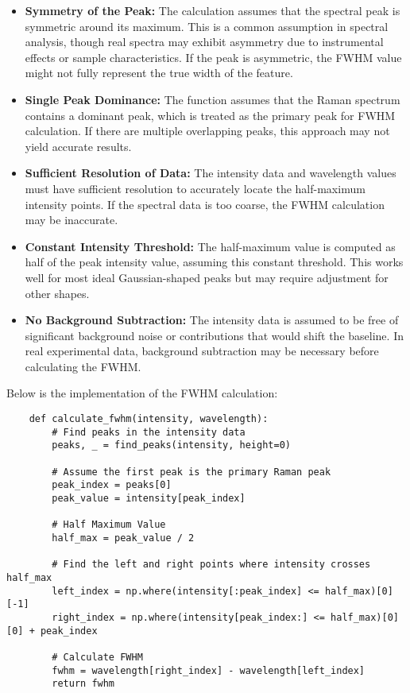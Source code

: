 \documentclass{article}
\begin{document}
    \begin{itemize}
        \item \textbf{Symmetry of the Peak:} The calculation assumes that the spectral peak is symmetric around its maximum. This is a common assumption in spectral analysis, though real spectra may exhibit asymmetry due to instrumental effects or sample characteristics. If the peak is asymmetric, the FWHM value might not fully represent the true width of the feature.
        \item \textbf{Single Peak Dominance:} The function assumes that the Raman spectrum contains a dominant peak, which is treated as the primary peak for FWHM calculation. If there are multiple overlapping peaks, this approach may not yield accurate results.
        \item \textbf{Sufficient Resolution of Data:} The intensity data and wavelength values must have sufficient resolution to accurately locate the half-maximum intensity points. If the spectral data is too coarse, the FWHM calculation may be inaccurate.
        \item \textbf{Constant Intensity Threshold:} The half-maximum value is computed as half of the peak intensity value, assuming this constant threshold. This works well for most ideal Gaussian-shaped peaks but may require adjustment for other shapes.
        \item \textbf{No Background Subtraction:} The intensity data is assumed to be free of significant background noise or contributions that would shift the baseline. In real experimental data, background subtraction may be necessary before calculating the FWHM.
    \end{itemize}

    Below is the implementation of the FWHM calculation:

    \begin{verbatim}
    def calculate_fwhm(intensity, wavelength):
        # Find peaks in the intensity data
        peaks, _ = find_peaks(intensity, height=0)
        
        # Assume the first peak is the primary Raman peak
        peak_index = peaks[0]
        peak_value = intensity[peak_index]
        
        # Half Maximum Value
        half_max = peak_value / 2
        
        # Find the left and right points where intensity crosses half_max
        left_index = np.where(intensity[:peak_index] <= half_max)[0][-1]
        right_index = np.where(intensity[peak_index:] <= half_max)[0][0] + peak_index
        
        # Calculate FWHM
        fwhm = wavelength[right_index] - wavelength[left_index]
        return fwhm
    \end{verbatim}
    
\end{document}
